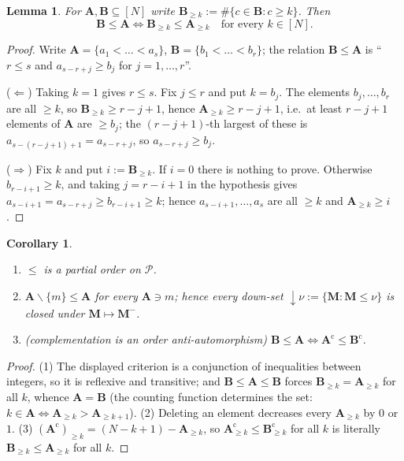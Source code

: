 \documentclass[11pt]{article}
\newtheorem{lem}[thm]{Lemma}
\newtheorem{cor}[thm]{Corollary}
\theoremstyle{definition}
\newcommand{\bM}{\mathbf{M}}
\newcommand{\bA}{\mathbf{A}}
\newcommand{\bB}{\mathbf{B}}
\newcommand{\sm}{\smallsetminus}
\begin{document}
\begin{lem}\label{lem:order}
For $\bA,\bB\subseteq[N]$ write $\bB_{\ge k}:=\#\{c\in\bB:c\ge k\}$.  Then
\[
  \bB\le\bA
  \iff
  \bB_{\ge k}\le\bA_{\ge k}\quad\text{for every }k\in[N].
\]
\end{lem}

\begin{proof}
Write $\bA=\{a_1<\dots<a_s\}$, $\bB=\{b_1<\dots<b_r\}$; the relation $\bB\le\bA$
is ``$r\le s$ and $a_{s-r+j}\ge b_j$ for $j=1,\dots,r$''.

($\Leftarrow$)  Taking $k=1$ gives $r\le s$.  Fix $j\le r$ and put $k=b_j$.  The
elements $b_j,\dots,b_r$ are all $\ge k$, so $\bB_{\ge k}\ge r-j+1$, hence
$\bA_{\ge k}\ge r-j+1$, i.e.\ at least $r-j+1$ elements of $\bA$ are $\ge b_j$;
the $(r-j+1)$-th largest of these is $a_{s-(r-j+1)+1}=a_{s-r+j}$, so
$a_{s-r+j}\ge b_j$.

($\Rightarrow$)  Fix $k$ and put $i:=\bB_{\ge k}$.  If $i=0$ there is nothing to
prove.  Otherwise $b_{r-i+1}\ge k$, and taking $j=r-i+1$ in the hypothesis gives
$a_{s-i+1}=a_{s-r+j}\ge b_{r-i+1}\ge k$; hence $a_{s-i+1},\dots,a_s$ are all
$\ge k$ and $\bA_{\ge k}\ge i$.
\end{proof}

\begin{cor}\label{cor:order}
\begin{enumerate}
\item $\le$ is a partial order on $\mathcal{P}$.
\item $\bA\sm\{m\}\le\bA$ for every $\bA\ni m$; hence every down-set
      $\downarrow\!\nu:=\{\bM:\bM\le\nu\}$ is closed under $\bM\mapsto\bM^{-}$.
\item \textup{(complementation is an order anti-automorphism)}
      $\bB\le\bA\iff\bA^{\mathrm c}\le\bB^{\mathrm c}$.
\end{enumerate}
\end{cor}

\begin{proof}
(1) The displayed criterion is a conjunction of inequalities between integers, so
it is reflexive and transitive; and $\bB\le\bA\le\bB$ forces $\bB_{\ge k}=\bA_{\ge k}$
for all $k$, whence $\bA=\bB$ (the counting function determines the set:
$k\in\bA\iff\bA_{\ge k}>\bA_{\ge k+1}$).
(2) Deleting an element decreases every $\bA_{\ge k}$ by $0$ or $1$.
(3) $(\bA^{\mathrm c})_{\ge k}=(N-k+1)-\bA_{\ge k}$, so
$\bA^{\mathrm c}_{\ge k}\le\bB^{\mathrm c}_{\ge k}$ for all $k$ is literally
$\bB_{\ge k}\le\bA_{\ge k}$ for all $k$.
\end{proof}
\end{document}
